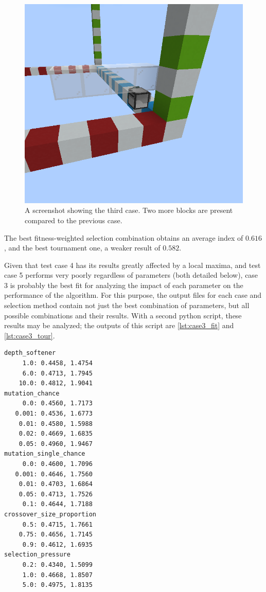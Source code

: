 \documentclass{report}
\newenvironment{code}{\captionsetup{type=listing}}{}
\begin{document}
\begin{figure}[H]
    \centering
    \includegraphics[scale=0.3]{minecraft4}
    \caption{A screenshot showing the third case. Two more blocks are present compared to the previous case.}
\end{figure}

The best fitness-weighted selection combination obtains an average index of $0.616$, and the best tournament one, a weaker result of $0.582$.

Given that test case 4 has its results greatly affected by a local maxima, and test case 5 performs very poorly regardless of parameters (both detailed below), case 3 is probably the best fit for analyzing the impact of each parameter on the performance of the algorithm. For this purpose, the output files for each case and selection method contain not just the best combination of parameters, but all possible combinations and their results. With a second python script, these results may be analyzed; the outputs of this script are \autoref{lst:case3_fit} and \autoref{lst:case3_tour}.

\begin{code}
    \begin{verbatim}
depth_softener
     1.0: 0.4458, 1.4754
     6.0: 0.4713, 1.7945
    10.0: 0.4812, 1.9041
mutation_chance
     0.0: 0.4560, 1.7173
   0.001: 0.4536, 1.6773
    0.01: 0.4580, 1.5988
    0.02: 0.4669, 1.6835
    0.05: 0.4960, 1.9467
mutation_single_chance
     0.0: 0.4600, 1.7096
   0.001: 0.4646, 1.7560
    0.01: 0.4703, 1.6864
    0.05: 0.4713, 1.7526
     0.1: 0.4644, 1.7188
crossover_size_proportion
     0.5: 0.4715, 1.7661
    0.75: 0.4656, 1.7145
     0.9: 0.4612, 1.6935
selection_pressure
     0.2: 0.4340, 1.5099
     1.0: 0.4668, 1.8507
     5.0: 0.4975, 1.8135
    \end{verbatim}
    \caption{Average Dice index and depth for each parameter of the fitness-weighted selection runs.}
    \label{lst:case3_fit}
\end{code}
\end{document}
